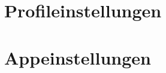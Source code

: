 \hypertarget{profileinstellungen}{%
\section{Profileinstellungen}\label{profileinstellungen}}

\hypertarget{appeinstellungen}{%
\section{Appeinstellungen}\label{appeinstellungen}}
